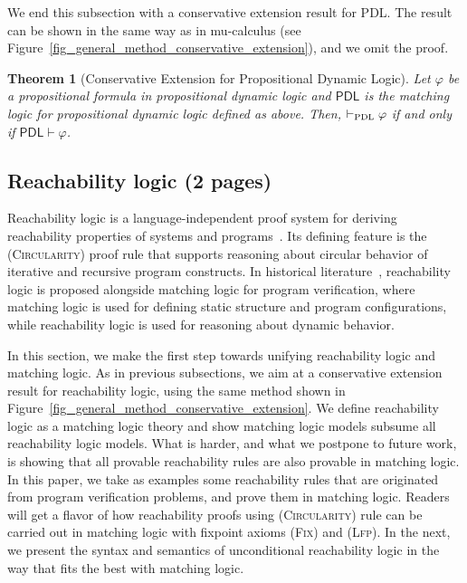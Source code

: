 \documentclass[letter,12pt]{article}
\newtheorem{theorem}{Theorem}
\newcommand{\MLPDL}{\mathsf{PDL}}
\newcommand{\prule}[1]{\textsc{(#1)}}
\newcommand{\circularity}{\prule{Circularity}\xspace}
\newcommand{\Lfp}{\prule{Lfp}\xspace}
\newcommand{\Fix}{\prule{Fix}\xspace}
\newcommand{\PDL}{\textsc{PDL}}
\begin{document}
We end this subsection with a conservative extension result for PDL.
The result can be shown in the same way as in mu-calculus 
(see Figure~\ref{fig_general_method_conservative_extension}),
and we omit the proof.
\begin{theorem}[Conservative Extension for Propositional Dynamic Logic]
Let $\varphi$ be a propositional formula in propositional dynamic logic
and $\MLPDL$ is the matching logic for propositional dynamic logic defined as above.
Then, $\vdash_\PDL\varphi$ if and only if $\MLPDL \vdash \varphi$.
\end{theorem}

\subsection{Reachability logic (2 pages)}

Reachability logic is a language-independent proof system for deriving reachability properties
of systems and programs~\cite{bibid}.
Its defining feature is the \circularity proof rule that supports reasoning about
circular behavior of iterative and recursive program constructs.
In historical literature~\cite{bibid},
reachability logic is proposed alongside matching logic for program verification,
where matching logic is used for defining static structure and
program configurations, while reachability logic is used for reasoning about dynamic behavior.


In this section, we make the first step towards 
unifying reachability logic and matching logic.
As in previous subsections, we aim at a conservative extension result
for reachability logic,
using the same method shown in 
Figure~\ref{fig_general_method_conservative_extension}.
We define reachability logic as a matching logic theory
and show 
matching logic models subsume all reachability logic models.
What is harder, and what we postpone to future work,
is showing that 
all provable reachability rules are also provable in matching logic.
In this paper, we take as examples some reachability rules that are
originated from program verification problems,
and prove them in matching logic.
Readers will get a flavor of how reachability proofs using \circularity rule
can be  carried out in matching logic with fixpoint axioms \Fix and \Lfp.
In the next, we present the syntax and semantics of unconditional reachability 
logic in the way that fits the best with matching logic.
\end{document}
